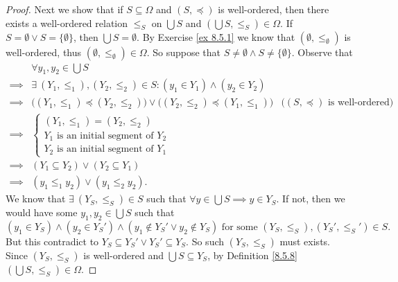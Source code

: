 \begin{proof}
    Next we show that if \(S \subseteq \Omega\) and \((S, \preceq)\) is well-ordered, then there exists a well-ordered relation \(\leq_S\) on \(\bigcup S\) and \((\bigcup S, \leq_S) \in \Omega\).
    If \(S = \emptyset \lor S = \{\emptyset\}\), then \(\bigcup S = \emptyset\).
    By Exercise \ref{ex 8.5.1} we know that \((\emptyset, \leq_{\emptyset})\) is well-ordered, thus \((\emptyset, \leq_{\emptyset}) \in \Omega\).
    So suppose that \(S \neq \emptyset \land S \neq \{\emptyset\}\).
    Observe that
    \begin{align*}
                 & \forall y_1, y_2 \in \bigcup S                                                                                                               \\
        \implies & \exists\ (Y_1, \leq_1), (Y_2, \leq_2) \in S : (y_1 \in Y_1) \land (y_2 \in Y_2)                                                              \\
        \implies & \big((Y_1, \leq_1) \preceq (Y_2, \leq_2)\big) \lor \big((Y_2, \leq_2) \preceq (Y_1, \leq_1)\big) & \text{(\((S, \preceq)\) is well-ordered)} \\
        \implies & \begin{cases}
                       (Y_1, \leq_1) = (Y_2, \leq_2)             \\
                       Y_1 \text{ is an initial segment of } Y_2 \\
                       Y_2 \text{ is an initial segment of } Y_1
                   \end{cases}                                                                                                    \\
        \implies & (Y_1 \subseteq Y_2) \lor (Y_2 \subseteq Y_1)                                                                                                 \\
        \implies & (y_1 \leq_1 y_2) \lor (y_1 \leq_2 y_2).
    \end{align*}
    We know that \(\exists\ (Y_S, \leq_S) \in S\) such that \(\forall y \in \bigcup S \implies y \in Y_S\).
    If not, then we would have some \(y_1, y_2 \in \bigcup S\) such that
    \[
        (y_1 \in Y_S) \land (y_2 \in Y_S') \land (y_1 \notin Y_S' \lor y_2 \notin Y_S) \text{ for some } (Y_S, \leq_S), (Y_S', \leq_S') \in S.
    \]
    But this contradict to \(Y_S \subseteq Y_S' \lor Y_S' \subseteq Y_S\).
    So such \((Y_S, \leq_S)\) must exists.
    Since \((Y_S, \leq_S)\) is well-ordered and \(\bigcup S \subseteq Y_S\), by Definition \ref{8.5.8} \((\bigcup S, \leq_S) \in \Omega\).


\end{proof}
